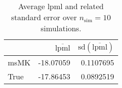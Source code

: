 \begin{table}[H]

\caption{Average lpml and related standard error over $n_{\text{sim}} = 10$ simulations.}
\centering
\begin{tabular}[t]{lrr}
\toprule
  & $\overbar{\text{lpml}}$ & $\text{sd}(\overbar{\text{lpml}})$\\
\midrule
msMK & -18.07059 & 0.1107695\\
True & -17.86453 & 0.0892519\\
\bottomrule
\end{tabular}
\end{table}